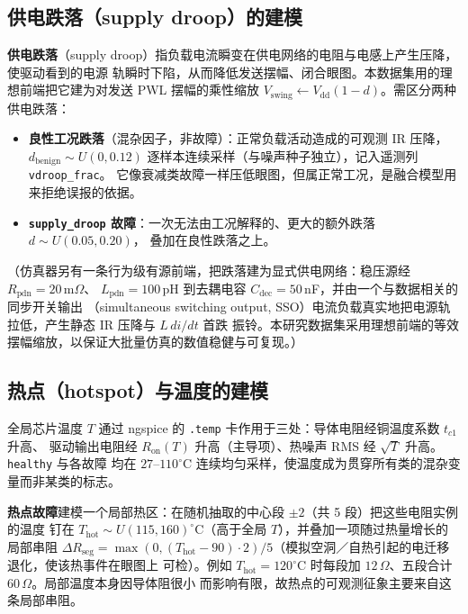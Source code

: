\documentclass[11pt,a4paper,fontset=mac]{ctexart}
\newcommand{\term}[1]{\textbf{#1}}
\begin{document}
\subsection{供电跌落（supply droop）的建模}\label{sec:droopmodel}
\term{供电跌落}（supply droop）指负载电流瞬变在供电网络的电阻与电感上产生压降，使驱动看到的电源
轨瞬时下陷，从而降低发送摆幅、闭合眼图。本数据集用的理想前端把它建为对发送 PWL 摆幅的乘性缩放
$V_\text{swing}\!\leftarrow\!V_\text{dd}(1{-}d)$。需区分两种供电跌落：
\begin{itemize}
\item \textbf{良性工况跌落}（混杂因子，非故障）：正常负载活动造成的可观测 IR 压降，
$d_\text{benign}\sim U(0,0.12)$ 逐样本连续采样（与噪声种子独立），记入遥测列 \texttt{vdroop\_frac}。
它像衰减类故障一样压低眼图，但属正常工况，是融合模型用来拒绝误报的依据。
\item \textbf{\texttt{supply\_droop} 故障}：一次无法由工况解释的、更大的额外跌落 $d\sim U(0.05,0.20)$，
叠加在良性跌落之上。
\end{itemize}
（仿真器另有一条行为级有源前端，把跌落建为显式供电网络：稳压源经 $R_\text{pdn}{=}20\,\text{m}\Omega$、
$L_\text{pdn}{=}100\,$pH 到去耦电容 $C_\text{dec}{=}50\,$nF，并由一个与数据相关的同步开关输出
（simultaneous switching output, SSO）电流负载真实地把电源轨拉低，产生静态 IR 压降与 $L\,di/dt$ 首跌
振铃。本研究数据集采用理想前端的等效摆幅缩放，以保证大批量仿真的数值稳健与可复现。）

\subsection{热点（hotspot）与温度的建模}
全局芯片温度 $T$ 通过 ngspice 的 \texttt{.temp} 卡作用于三处：导体电阻经铜温度系数 $t_{c1}$ 升高、
驱动输出电阻经 $R_\text{on}(T)$ 升高（主导项）、热噪声 RMS 经 $\sqrt{T}$ 升高。\texttt{healthy} 与各故障
均在 $27$--$110^\circ$C 连续均匀采样，使温度成为贯穿所有类的混杂变量而非某类的标志。

\textbf{热点故障}建模一个局部热区：在随机抽取的中心段 $\pm2$（共 5 段）把这些电阻实例的温度
钉在 $T_\text{hot}\sim U(115,160)^\circ$C（高于全局 $T$），并叠加一项随过热量增长的局部串阻
$\Delta R_\text{seg}=\max(0,(T_\text{hot}{-}90)\!\cdot\!2)/5$（模拟空洞／自热引起的电迁移退化，使该热事件在眼图上
可检）。例如 $T_\text{hot}{=}120^\circ$C 时每段加 $12\,\Omega$、五段合计 $60\,\Omega$。局部温度本身因导体阻很小
而影响有限，故热点的可观测征象主要来自这条局部串阻。
\end{document}
